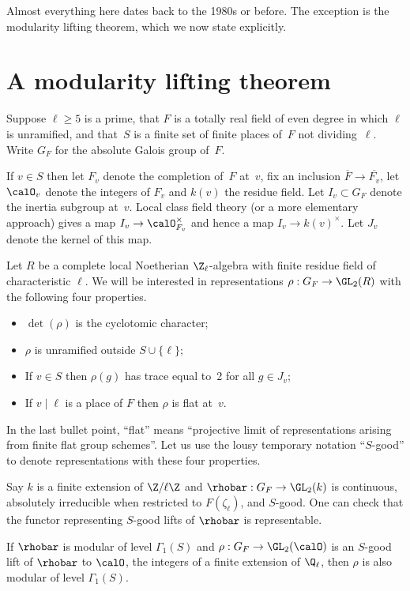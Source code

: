 Almost everything here dates back to the 1980s or before.
The exception is the modularity lifting theorem, which we now state explicitly.

\section{A modularity lifting theorem}

Suppose $\ell\geq5$ is a prime, that $F$ is a totally real field of even degree in which $\ell$
is unramified, and that~$S$ is a finite set of finite places of~$F$ not dividing~$\ell$. Write
$G_F$ for the absolute Galois group of~$F$.

If $v\in S$ then let $F_v$ denote the completion of~$F$ at~$v$, fix an inclusion $\overline{F}\to\overline{F_v}$,
let $\calO_v$ denote the integers of $F_v$ and $k(v)$ the residue field. Let $I_v\subset G_F$ denote the inertia
subgroup at~$v$. Local class field theory (or a more elementary approach) gives a map $I_v\to\calO_{F_v}^\times$
and hence a map $I_v\to k(v)^\times$. Let $J_v$ denote the kernel of this map.

Let $R$ be a complete local Noetherian $\Z_\ell$-algebra with finite residue field of characteristic $\ell$.
We will be interested in representations $\rho:G_F\to\GL_2(R)$ with the following four properties.
\begin{itemize}
    \item $\det(\rho)$ is the cyclotomic character;
    \item $\rho$ is unramified outside $S\cup\{\ell\}$;
    \item If $v\in S$ then $\rho(g)$ has trace equal to~2 for all $g\in J_v$;
    \item If $v\mid\ell$ is a place of $F$ then $\rho$ is flat at~$v$.
\end{itemize}

In the last bullet point, ``flat'' means ``projective limit of representations arising from
finite flat group schemes''. Let us use the lousy temporary notation ``$S$-good'' to denote
representations with these four properties.

Say $k$ is a finite extension of $\Z/\ell\Z$ and $\rhobar:G_F\to\GL_2(k)$ is continuous,
absolutely irreducible when restricted to $F(\zeta_\ell)$, and $S$-good. One can check
that the functor representing $S$-good lifts of $\rhobar$ is representable.

\begin{theorem}
    \label{modularity_lifting_theorem}
      \notready
        If $\rhobar$ is modular of level $\Gamma_1(S)$ and $\rho:G_F\to\GL_2(\calO)$ is
        an $S$-good lift of $\rhobar$ to $\calO$, the integers of a finite extension of $\Q_\ell$,
        then $\rho$ is also modular of level $\Gamma_1(S)$.
\end{theorem}

